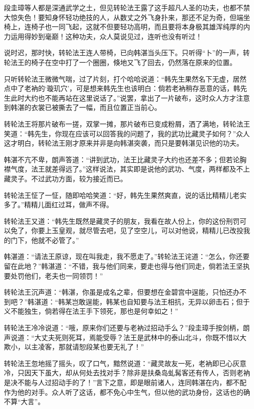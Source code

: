 \documentclass[12pt,oneside]{book}
\begin{document}
段圭璋等人都是深通武学之土，但见转轮法王露了这手超凡人圣的功夫，也都不禁大惊失色！要知身怀轻功绝技的人，从数丈之外飞身扑来，那还不足为奇，但端坐椅上，连椅子也一同飞起，这就不但要轻功高明，而且要将本身极其雄浑纯厚的内力运用得妙到毫巅！这种功夫，众人莫说见过，连听也没有听过！

说时迟，那时快，转轮法王连人带椅，已向韩湛当头压下。只听得``卜''的一声，转轮法王的椅子在空中打了一个圈圈，倏地又飞了回去，仍然落在原来的位置。

只听转轮法王微微气喘，过了片刻，打个哈哈说道：``韩先生果然名下无虚，居然点中了老衲的`璇玑穴'，可是想来韩先生也该明白：倘若老衲稍存恶意的话，韩先生此时大约也不能再站在这里说话了。''说罢，拿出了一片破布，这时众人方才注意到韩湛的衣裳已被撕去了一幅，而且位置正当前心。

转轮法王将那片破布一搓，双掌一摊，那片破布已变成粉屑，洒了满地，转轮法王笑道：``韩先生，你现在应该可以回答我的问题了，我的武功比藏灵子如何？''众人这才明白，转轮法王刚才原来并非是向韩湛突袭，而只是要韩湛见识他的功夫。

韩湛不亢不卑，朗声答道：``讲到武功，法王比藏灵子大约也还差不多；但若论胸襟气度，法王就差得远了。''这样说法，其实即是说他的武功、气度，两样都及不上藏灵子。不过武功方面，较为接近而已。

转轮法王怔了一怔，随即哈哈笑道：``好，韩先生果然爽直，说的话比精精儿老实多了。''精精儿面红过耳，做声不得。

转轮法王又道：``韩先生既然是藏灵子的朋友，我看在故人份上，你的这份刑罚可以免了，你要上玉皇观，就尽管去吧，见了空空儿，可以对他说，精精儿已改投我的门下，他就不必管了。''

韩湛道：``请法王原谅，现在叫我走，我不愿走了。''转轮法王诧道：``怎么，你还要留在此地？''韩湛道：``不错，我与他们同来，要走也得与他们同走，倘若法王坚执要处罚他们，老夫也一同领罚！''

转轮法王沉声道：``韩湛，你虽是成名之辈，但要想在金碧宫中逞能，只怕还办不到吧？''韩湛道：``韩某岂敢逞能，韩某也自知要与法王相抗，无异以卵击石；但于义不能独生，倘若得在法王手下领死，那也是何幸如之！''

转轮法王冷冷说道：``哦，原来你们还要与老衲过招动手么？''段圭璋手按剑柄，朗声说道：``大丈夫死则死耳，焉能受辱？法王是武林中的泰山北斗，你既不惜以大欺小，以主凌客，那就请恕段某也要无礼了！''

转轮法王忽地摇了摇头，叹了口气，黯然说道：``藏灵故友一死，老衲即已心灰意冷，只因天下虽大，却从何处去找对手？除非是扶桑岛虬髯客还有传人，否则老衲是决不能与人过招动手的了！''言下之意，即是眼前诸人，连同韩湛在内，都不配作为他的对手。众人听了这话，都不免心中生气，但以他的武功身份，这话也的确不算``大言''。
\end{document}
